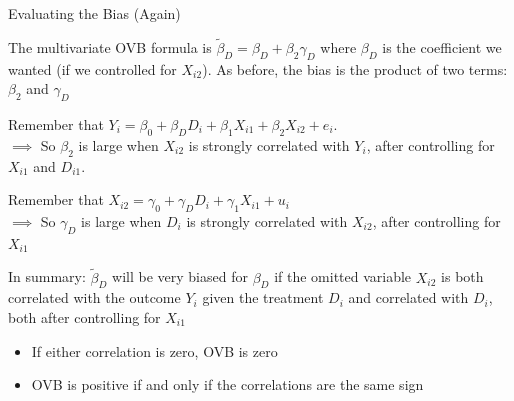 \documentclass[11pt,english,handout]{beamer}
\newenvironment{wideitemize}{\itemize\addtolength{\itemsep}{10pt}}{\enditemize}
\begin{document}
\begin{frame}{Evaluating the Bias (Again)}
%
	\begin{wideitemize}
		\item
		The multivariate OVB formula is $\tilde\beta_D=\beta_D+\beta_2\gamma_D$ where $\beta_D$ is the coefficient we wanted (if we controlled for $X_{i2}$). \pause As before, the bias is the product of two terms: $\beta_2$ and $\gamma_D$\\
		
		
		\pause
		\item
		Remember that $Y_i = \beta_0 + \beta_{D} D_i + \beta_{1} X_{i1} + \beta_{2} X_{i2}+e_i$. \\
		$\implies$ So $\beta_2$ is large when $X_{i2}$ is strongly correlated with $Y_i$, after controlling for $X_{i1}$ and $D_{i1}$.
		
		\pause
		\item
		Remember that $X_{i2} = \gamma_0 + \gamma_D D_i + \gamma_1 X_{i1}+ u_i$\\
		$\implies$ So $\gamma_D$ is large when $D_i$ is strongly correlated with $X_{i2}$, after controlling for $X_{i1}$
		
		\pause
		\item
		In summary: $\tilde\beta_D$ will be very biased for $\beta_D$ if the omitted variable $X_{i2}$ is both correlated with the outcome $Y_i$ given the treatment $D_i$ and correlated with $D_i$, both after controlling for $X_{i1}$\smallskip\pause{}

\begin{itemize}
\item If either correlation is zero, OVB is zero\smallskip\pause{}
\item OVB is positive if and only if the correlations are the same sign
\end{itemize}
		
	\end{wideitemize}
	
\end{frame}
\end{document}
